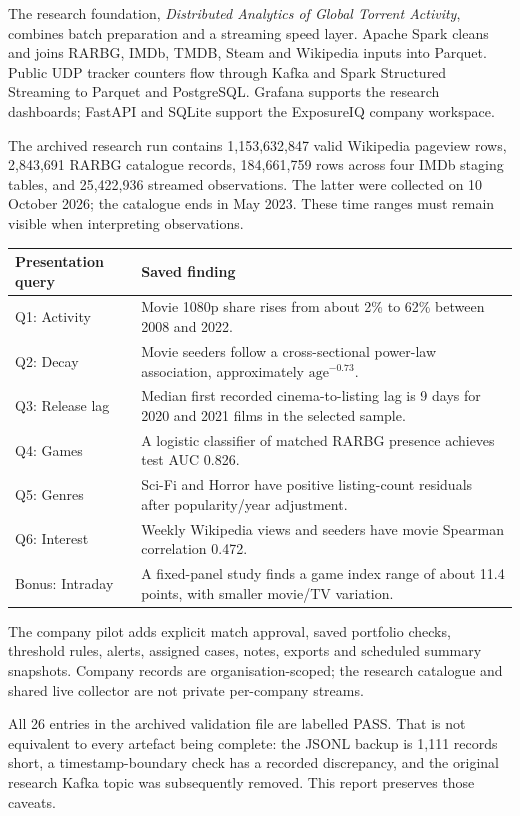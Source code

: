 \documentclass[11pt,a4paper]{article}
\begin{document}
The research foundation, \textit{Distributed Analytics of Global Torrent
Activity}, combines batch preparation and a streaming speed layer. Apache
Spark cleans and joins RARBG, IMDb, TMDB, Steam and Wikipedia inputs into
Parquet. Public UDP tracker counters flow through Kafka and Spark Structured
Streaming to Parquet and PostgreSQL. Grafana supports the research dashboards;
FastAPI and SQLite support the ExposureIQ company workspace.

The archived research run contains 1,153,632,847 valid Wikipedia pageview rows,
2,843,691 RARBG catalogue records, 184,661,759 rows across four IMDb staging
tables, and 25,422,936 streamed observations. The latter were collected on
10 October 2026; the catalogue ends in May 2023. These time ranges must remain
visible when interpreting observations.

\begin{tabularx}{\linewidth}{@{}lY@{}}
\toprule
\textbf{Presentation query} & \textbf{Saved finding}\\
\midrule
Q1: Activity & Movie 1080p share rises from about 2\% to 62\% between 2008 and 2022.\\
Q2: Decay & Movie seeders follow a cross-sectional power-law association,
approximately $\mathrm{age}^{-0.73}$.\\
Q3: Release lag & Median first recorded cinema-to-listing lag is 9 days for
2020 and 2021 films in the selected sample.\\
Q4: Games & A logistic classifier of matched RARBG presence achieves test AUC 0.826.\\
Q5: Genres & Sci-Fi and Horror have positive listing-count residuals after
popularity/year adjustment.\\
Q6: Interest & Weekly Wikipedia views and seeders have movie Spearman correlation 0.472.\\
Bonus: Intraday & A fixed-panel study finds a game index range of about
11.4 points, with smaller movie/TV variation.\\
\bottomrule
\end{tabularx}

The company pilot adds explicit match approval, saved portfolio checks,
threshold rules, alerts, assigned cases, notes, exports and scheduled summary
snapshots. Company records are organisation-scoped; the research catalogue
and shared live collector are not private per-company streams.

All 26 entries in the archived validation file are labelled PASS. That is
not equivalent to every artefact being complete: the JSONL backup is 1,111
records short, a timestamp-boundary check has a recorded discrepancy, and
the original research Kafka topic was subsequently removed. This report
preserves those caveats.
\end{document}
